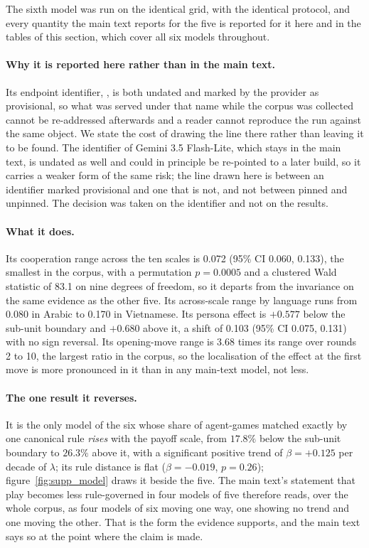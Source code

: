 \documentclass[11pt,a4paper]{article}
\newcommand{\lam}{\lambda}
\newcommand{\ci}[2]{(95\% CI #1, #2)}
\begin{document}
The sixth model was run on the identical grid, with the identical protocol, and
every quantity the main text reports for the five is reported for it here and
in the tables of this section, which cover all six models throughout.

\paragraph{Why it is reported here rather than in the main text.} Its endpoint
identifier, , is both undated and marked
by the provider as provisional, so what was served under that name while the
corpus was collected cannot be re-addressed afterwards and a reader cannot
reproduce the run against the same object. We state the cost of drawing the
line there rather than leaving it to be found. The identifier of Gemini 3.5
Flash-Lite, which stays in the main text, is undated as well and could in
principle be re-pointed to a later build, so it carries a weaker form of the
same risk; the line drawn here is between an identifier marked provisional and
one that is not, and not between pinned and unpinned. The decision was taken on
the identifier and not on the results.

\paragraph{What it does.} Its cooperation range across the ten scales is 0.072
\ci{0.060}{0.133}, the smallest in the corpus, with a permutation $p = 0.0005$
and a clustered Wald statistic of 83.1 on nine degrees of freedom, so it
departs from the invariance on the same evidence as the other five. Its
across-scale range by language runs from 0.080 in Arabic to 0.170 in
Vietnamese. Its persona effect is $+0.577$ below the sub-unit boundary and
$+0.680$ above it, a shift of 0.103 \ci{0.075}{0.131} with no sign reversal.
Its opening-move range is 3.68 times its range over rounds 2 to 10, the largest
ratio in the corpus, so the localisation of the effect at the first move is
more pronounced in it than in any main-text model, not less.

\paragraph{The one result it reverses.} It is the only model of the six whose
share of agent-games matched exactly by one canonical rule \emph{rises} with
the payoff scale, from $17.8\%$ below the sub-unit boundary to $26.3\%$ above
it, with a significant positive trend of $\beta = +0.125$ per decade of $\lam$;
its rule distance is flat ($\beta = -0.019$, $p = 0.26$);
figure~\ref{fig:supp_model} draws it beside the five. The main text's
statement that play becomes less rule-governed in four models of five therefore
reads, over the whole corpus, as four models of six moving one way, one showing
no trend and one moving the other. That is the form the evidence supports, and
the main text says so at the point where the claim is made.
\end{document}
